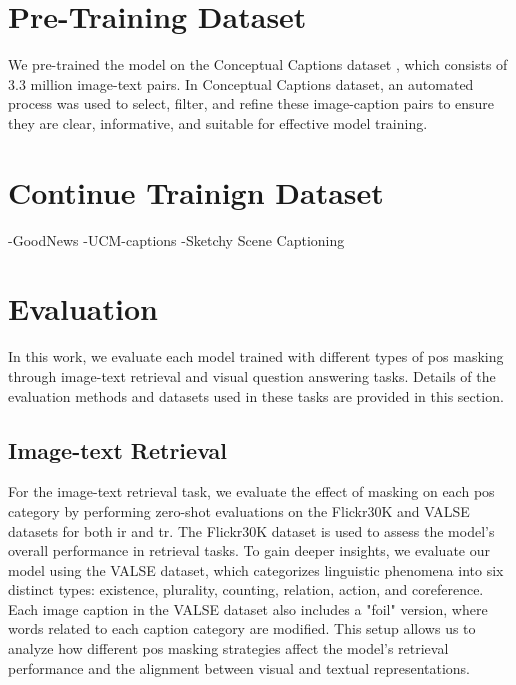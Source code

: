 \section{Pre-Training Dataset}
We pre-trained the model on the Conceptual Captions dataset \cite{conceptual-caption}, which consists of 3.3 million image-text pairs. 
In Conceptual Captions dataset, an automated process was used to select, filter, and refine these image-caption pairs to ensure they are clear, informative, and suitable for effective model training.

\section{Continue Trainign Dataset}
-GoodNews
-UCM-captions
-Sketchy Scene Captioning

\section{Evaluation}
In this work, we evaluate each model trained with different types of \acrshort{pos} masking through image-text retrieval and visual question answering tasks. 
Details of the evaluation methods and datasets used in these tasks are provided in this section.

\subsection{Image-text Retrieval}
For the image-text retrieval task, we evaluate the effect of masking on each \acrshort{pos} category by performing zero-shot evaluations on the Flickr30K \cite{flickr30k} and VALSE \cite{valse} datasets for both \acrfull{ir} and \acrfull{tr}. 
The Flickr30K dataset is used to assess the model's overall performance in retrieval tasks. 
To gain deeper insights, we evaluate our model using the VALSE dataset, which categorizes linguistic phenomena into six distinct types: existence, plurality, counting, relation, action, and coreference.
Each image caption in the VALSE dataset also includes a "foil" version, where words related to each caption category are modified. 
This setup allows us to analyze how different \acrshort{pos} masking strategies affect the model's retrieval performance and the alignment between visual and textual representations.

